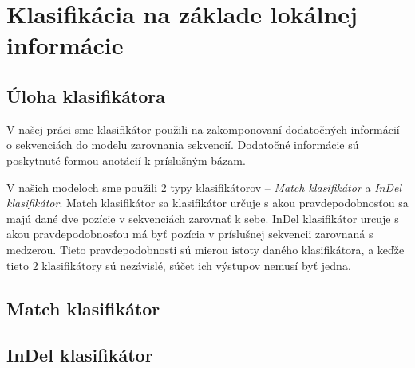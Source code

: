 \chapter{Klasifikácia na základe lokálnej informácie}

\section{Úloha klasifikátora}

V našej práci sme klasifikátor použili na zakomponovaní dodatočných informácií o sekvenciách do modelu zarovnania sekvencií. Dodatočné informácie sú poskytnuté formou anotácií k príslušným bázam.

V našich modeloch sme použili 2 typy klasifikátorov -- \textit{Match klasifikátor} a \textit{InDel klasifikátor}. Match klasifikátor sa klasifikátor určuje s akou pravdepodobnosťou sa majú dané dve pozície v sekvenciách zarovnať k sebe. InDel klasifikátor urcuje s akou pravdepodobnosťou má byť pozícia v príslušnej sekvencii zarovnaná s medzerou. Tieto pravdepodobnosti sú mierou istoty daného klasifikátora, a keďže tieto 2 klasifikátory sú nezávislé, súčet ich výstupov nemusí byť jedna.

\section{Match klasifikátor}

\section{InDel klasifikátor}
